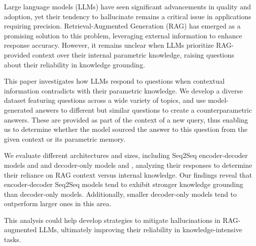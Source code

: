 Large language models (LLMs) have seen significant advancements in quality and adoption, yet their tendency to hallucinate remains a critical issue in applications requiring precision.
Retrieval-Augmented Generation (RAG) has emerged as a promising solution to this problem, leveraging external information to enhance response accuracy.
However, it remains unclear when LLMs prioritize RAG-provided context over their internal parametric knowledge, raising questions about their reliability in knowledge grounding.

This paper investigates how LLMs respond to questions when contextual information contradicts with their parametric knowledge.
We develop a diverse dataset featuring questions across a wide variety of topics, and use model-generated answers to different but similar questions to create a counterparametric answers.
These are provided as part of the context of a new query, thus enabling us to determine whether the model sourced the answer to this question from the given context or its parametric memory.

We evaluate different architectures and sizes, including Seq2Seq encoder-decoder models \smallflan{} and \bigflan{} and decoder-only models \smallllama{} and \bigllama{}, analyzing their responses to determine their reliance on RAG context versus internal knowledge.
Our findings reveal that encoder-decoder Seq2Seq models tend to exhibit stronger knowledge grounding than decoder-only models.
Additionally, smaller decoder-only models tend to outperform larger ones in this area.

This analysis could help develop strategies to mitigate hallucinations in RAG-augmented LLMs, ultimately improving their reliability in knowledge-intensive tasks.
